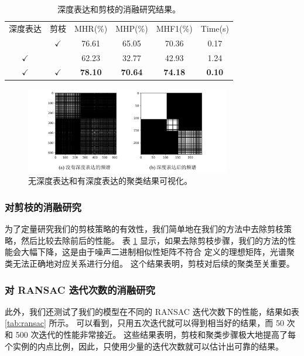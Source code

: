 \setlength{\tabcolsep}{2pt}
\begin{table}
  \caption{
    深度表达和剪枝的消融研究结果。
    }
  \centering
  \begin{tabular}{cccccc}
    \hline\noalign{\smallskip}
    深度表达 & 剪枝 & MHR(\%)         & MHP(\%)         & MHF1(\%)         & Time(s)       \\
  \noalign{\smallskip}
  \hline
  \noalign{\smallskip}
  & $\checkmark$       & 76.61          & 65.05          & 70.36          & 0.17          \\
  $\checkmark$                   &         & 62.23          & 32.77          & 42.93          & 1.24          \\
  $\checkmark$                &
 $\checkmark$     & \textbf{78.10} & \textbf{70.64} & \textbf{74.18} & \textbf{0.10}\\
  \hline
  \end{tabular}
  \label{tab:ablation}
\end{table}
\setlength{\tabcolsep}{1.4pt}


\begin{figure}
  \centering
  \includegraphics[width=0.8\textwidth]{images/spectral.pdf}
  \caption{
    无深度表达和有深度表达的聚类结果可视化。
    }
    \vspace{-0.5cm}
  \label{fig:spectral}
\end{figure}

\subsubsection{对剪枝的消融研究}
为了定量研究我们的剪枝策略的有效性，我们简单地在我们的方法中去除剪枝策略，然后比较去除前后的性能。
表 \ref{tab:ablation} 显示，如果去除剪枝步骤，我们的方法的性能会大幅下降，这是由于噪声二进制相似性矩阵不符合 \cite{li2007noise} 定义的理想矩阵，光谱聚类无法正确地对应关系进行分组。
这个结果表明，剪枝对后续的聚类至关重要。

\subsubsection{对 RANSAC 迭代次数的消融研究}
\vspace{-0.3cm}
此外，我们还测试了我们的模型在不同的 RANSAC 迭代次数下的性能，结果如表 \ref{tab:ransac} 所示。
可以看到，只用五次迭代就可以得到相当好的结果，而 50 次和 500 次迭代的性能非常接近。
这些结果表明，剪枝和聚类步骤极大地提高了每个实例的内点比例，因此，只使用少量的迭代次数就可以估计出可靠的结果。


